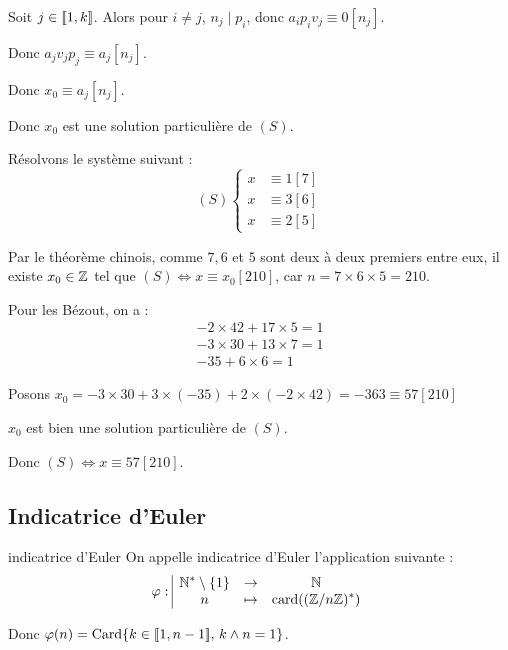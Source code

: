 Soit $j \in [\![1, k]\!]$. Alors pour $i \neq j$, $n_j \mid p_i$, donc $a_ip_iv_j \equiv 0 [n_j]$.

Donc $a_j v_j p_j \equiv a_j [n_j]$.

Donc $x_0 \equiv a_j [n_j]$.

Donc $x_0$ est une solution particulière de $(S)$.

\begin{exemple}
    Résolvons le système suivant : 
    \[
        (S) \left\{ 
            \begin{aligned}
                x & \equiv 1 [7] \\
                x & \equiv 3 [6] \\
                x & \equiv 2 [5]
            \end{aligned}
        \right.
    \]

    Par le théorème chinois, comme $7, 6$ et $5$ sont deux à deux premiers entre eux, 
    il existe $x_0 \in \mathbb{Z}$ tel que $(S) \Leftrightarrow x \equiv x_0 [210]$, car 
    $n = 7 \times 6 \times 5 = 210$.

    Pour les Bézout, on a :
    \[
        \begin{array}{rcl}
            -2 \times 42 + 17 \times 5 = 1 \\
            -3 \times 30 + 13 \times 7 = 1 \\
            - 35 + 6 \times 6 = 1
        \end{array}
    \]

    Posons $x_0 = -3 \times 30 + 3 \times (-35) + 2 \times (-2 \times 42) = -363 \equiv 57 [210] $

    $x_0$ est bien une solution particulière de $(S)$.

    Donc $(S) \Leftrightarrow x \equiv 57 [210]$.

\end{exemple}


\subsection{Indicatrice d'Euler }

\begin{definition}{indicatrice d'Euler}{}
    On appelle indicatrice d'Euler l'application suivante : 
    $$\varphi: \space \begin{array}{|ccc} \displaystyle \mathbb{N}^* \setminus \{1 \} & \to & \displaystyle \mathbb{N} \\ \displaystyle n & \mapsto & \displaystyle \operatorname{card}((\mathbb{Z}/n\mathbb{Z})^*) \end{array}$$

    Donc $\varphi(n) = \operatorname{Card}\{ k \in [\![1, n - 1]\!] , \, k \wedge n = 1\}$.

\end{definition}

